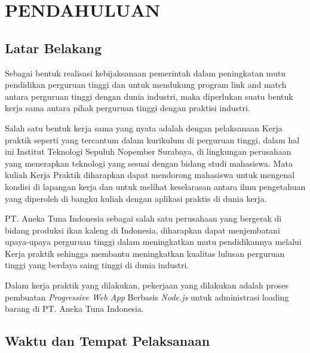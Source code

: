 \chapter{PENDAHULUAN}
\vspace{4ex}

\setlength{\parindent}{7ex}


\section{Latar Belakang}
\vspace{1ex}

Sebagai bentuk realisasi kebijaksanaan pemerintah dalam peningkatan mutu pendidikan perguruan tinggi dan untuk mendukung program link and match antara perguruan tinggi dengan dunia industri, maka diperlukan suatu bentuk kerja sama antara pihak perguruan tinggi dengan praktisi industri.
\vspace{0.5ex}

Salah satu bentuk kerja sama yang nyata adalah dengan pelaksanaan Kerja praktik seperti yang tercantum dalam kurikulum di perguruan tinggi, dalam hal ini Institut Teknologi Sepuluh Nopember Surabaya, di lingkungan perusahaan yang menerapkan teknologi yang sesuai dengan bidang studi mahasiswa.
Mata kuliah Kerja Praktik diharapkan dapat mendorong mahasiswa untuk mengenal kondisi di lapangan kerja dan untuk melihat keselarasan antara ilmu pengetahuan yang diperoleh di bangku kuliah dengan aplikasi praktis di dunia kerja.
\vspace{0.5ex}

PT. Aneka Tuna Indonesia sebagai salah satu perusahaan yang bergerak di bidang produksi ikan kaleng di Indonesia, diharapkan dapat menjembatani upaya-upaya perguruan tinggi dalam meningkatkan mutu pendidikannya melalui Kerja praktik sehingga membantu meningkatkan kualitas lulusan perguruan tinggi yang berdaya saing tinggi di dunia industri.
\vspace{0.5ex}

Dalam kerja praktik yang dilakukan, pekerjaan yang dilakukan adalah proses pembuatan \emph{Progressive Web App} Berbasis \emph{Node.js} untuk administrasi loading barang di PT. Aneka Tuna Indonesia.

\newpage

\section{Waktu dan Tempat Pelaksanaan}
\vspace{1ex}

